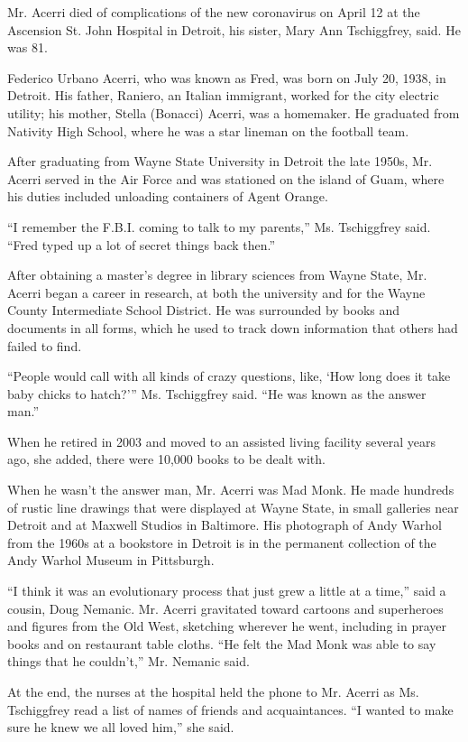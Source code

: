 Mr. Acerri died of complications of the new coronavirus on April 12 at
the Ascension St. John Hospital in Detroit, his sister, Mary Ann
Tschiggfrey, said. He was 81.

Federico Urbano Acerri, who was known as Fred, was born on July 20,
1938, in Detroit. His father, Raniero, an Italian immigrant, worked for
the city electric utility; his mother, Stella (Bonacci) Acerri, was a
homemaker. He graduated from Nativity High School, where he was a star
lineman on the football team.

After graduating from Wayne State University in Detroit the late 1950s,
Mr. Acerri served in the Air Force and was stationed on the island of
Guam, where his duties included unloading containers of Agent Orange.

``I remember the F.B.I. coming to talk to my parents,'' Ms. Tschiggfrey
said. ``Fred typed up a lot of secret things back then.''

After obtaining a master's degree in library sciences from Wayne State,
Mr. Acerri began a career in research, at both the university and for
the Wayne County Intermediate School District. He was surrounded by
books and documents in all forms, which he used to track down
information that others had failed to find.

``People would call with all kinds of crazy questions, like, `How long
does it take baby chicks to hatch?''' Ms. Tschiggfrey said. ``He was
known as the answer man.''

When he retired in 2003 and moved to an assisted living facility several
years ago, she added, there were 10,000 books to be dealt with.

When he wasn't the answer man, Mr. Acerri was Mad Monk. He made hundreds
of rustic line drawings that were displayed at Wayne State, in small
galleries near Detroit and at Maxwell Studios in Baltimore. His
photograph of Andy Warhol from the 1960s at a bookstore in Detroit is in
the permanent collection of the Andy Warhol Museum in Pittsburgh.

``I think it was an evolutionary process that just grew a little at a
time,'' said a cousin, Doug Nemanic. Mr. Acerri gravitated toward
cartoons and superheroes and figures from the Old West, sketching
wherever he went, including in prayer books and on restaurant table
cloths. ``He felt the Mad Monk was able to say things that he
couldn't,'' Mr. Nemanic said.

At the end, the nurses at the hospital held the phone to Mr. Acerri as
Ms. Tschiggfrey read a list of names of friends and acquaintances. ``I
wanted to make sure he knew we all loved him,'' she said.

